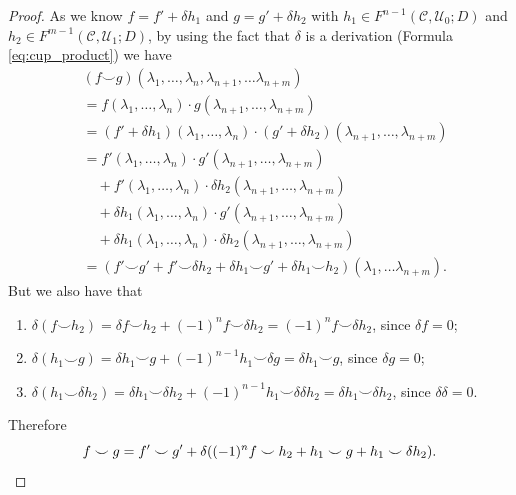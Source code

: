 \documentclass[10pt,a4paper]{amsart}
\newcommand{\CC}{\mathcal{C}}
\newcommand{\Uc}{\mathcal{U}}
\begin{document}
\begin{proof}
    As we know $f=f'+\delta h_1$ and $g=g'+\delta h_2$ with $h_1 \in F^{n-1}(\CC,\Uc_0;D)$ and $h_2 \in F^{m-1}(\CC,\Uc_1;D)$, by using the fact that $\delta$ is a derivation (Formula \eqref{eq:cup_product}) we have 
    \begin{align*}
         &(f \smile g)(\lambda_1,\ldots,\lambda_n, \lambda_{n+1}, \ldots \lambda_{n+m})\\
         &=f(\lambda_1,\ldots,\lambda_n) \cdot g(\lambda_{n+1},\ldots,\lambda_{n+m}) \\
         &=(f'+\delta h_1)(\lambda_1,\ldots,\lambda_n) \cdot (g'+\delta h_2)(\lambda_{n+1},\ldots,\lambda_{n+m}) \\
         &= f'(\lambda_1,\ldots,\lambda_n)\cdot g' (\lambda_{n+1},\ldots,\lambda_{n+m})\\ &\quad + f'(\lambda_1,\ldots,\lambda_n) \cdot \delta h_2 (\lambda_{n+1},\ldots,\lambda_{n+m}) \\ &\quad + \delta h_1(\lambda_1,\ldots,\lambda_n) \cdot g' (\lambda_{n+1},\ldots,\lambda_{n+m})\\
        & \quad+ \delta h_1 (\lambda_1,\ldots,\lambda_n) \cdot \delta h_2(\lambda_{n+1},\ldots,\lambda_{n+m}) \\
          &= (f' \smile g' + f' \smile \delta h_2 + \delta h_1 \smile g' + \delta h_1 \smile h_2) (\lambda_1,\ldots\lambda_{n+m}).
    \end{align*}
    But we also have that 
    \begin{enumerate}
        \item $\delta(f \smile h_2)=\delta f \smile h_2+(-1)^{n}f \smile \delta h_2=(-1)^{n}f \smile \delta h_2$, since $\delta f=0$;
        \item  $\delta(h_1 \smile g)=\delta h_1 \smile g+(-1)^{n-1} h_1 \smile \delta g= \delta h_1 \smile g$, since $\delta g=0$;
        \item $\delta(h_1 \smile \delta h_2)= \delta h_1 \smile \delta h_2 +(-1)^{n-1} h_1 \smile \delta  \delta h_2 =\delta h_1 \smile \delta h_2$, since $\delta \delta =0$.
    \end{enumerate}
    Therefore $$f \smile g= f'\smile g' +\delta((-1)^{n}f \smile h_2 + h_1 \smile g + h_1 \smile \delta h_2).\qedhere$$
\end{proof}
\end{document}
